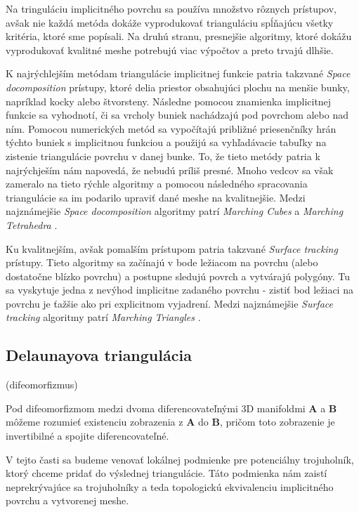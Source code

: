 Na tringuláciu implicitného povrchu sa používa množstvo rôznych prístupov, avšak nie každá metóda
dokáže vyprodukovať trianguláciu spĺňajúcu všetky kritéria, ktoré sme popísali. Na druhú stranu, 
presnejšie algoritmy, ktoré dokážu vyprodukovať kvalitné meshe potrebujú viac výpočtov a preto
trvajú dlhšie. 

K najrýchlejším metódam triangulácie implicitnej funkcie patria takzvané \textit{Space docomposition}
prístupy, ktoré delia priestor obsahujúci plochu na menšie bunky, napríklad kocky alebo štvorsteny.
Následne pomocou znamienka implicitnej funkcie sa vyhodnotí, či sa vrcholy buniek nachádzajú pod povrchom 
alebo nad ním. Pomocou numerických metód sa vypočítajú približné priesenčníky hrán týchto buniek s 
implicitnou funkciou a použijú sa vyhľadávacie tabuľky na zistenie triangulácie povrchu v danej bunke. 
To, že tieto metódy patria k najrýchješím nám napovedá, že nebudú príliš presné. Mnoho vedcov sa
však zameralo na tieto rýchle algoritmy a pomocou následného spracovania triangulácie sa im 
podarilo upraviť dané meshe na kvalitnejšie. Medzi najznámejšie \textit{Space docomposition} algoritmy
patrí \textit{Marching Cubes} \cite{lorensen1987marching} a \textit{Marching Tetrahedra} \cite{doi1991efficient}.

Ku kvalitnejším, avšak pomalším prístupom patria takzvané \textit{Surface tracking} prístupy.
Tieto algoritmy sa začínajú v bode ležiacom na povrchu (alebo dostatočne blízko povrchu) a 
postupne sledujú povrch a vytvárajú polygóny. Tu sa vyskytuje jedna z nevýhod implicitne zadaného
povrchu - zistiť bod ležiaci na povrchu je ťažšie ako pri explicitnom vyjadrení. Medzi najznámejšie 
\textit{Surface tracking} algoritmy patrí \textit{Marching Triangles} \cite{hilton1996marching}.



\subsection{Delaunayova triangulácia}

\begin{note}
    (difeomorfizmus)

    Pod difeomorfizmom medzi dvoma diferencovateľnými 3D manifoldmi $\mathbf{A}$ a $\mathbf{B}$ 
    môžeme rozumieť existenciu zobrazenia z $\mathbf{A}$ do $\mathbf{B}$, pričom toto zobrazenie 
    je invertibilné a spojite diferencovateľné. 
\end{note}

V tejto časti sa budeme venovať lokálnej podmienke pre potenciálny trojuholník, ktorý chceme pridať do 
výslednej triangulácie. Táto podmienka nám zaistí neprekrývajúce sa trojuholníky a teda topologickú 
ekvivalenciu implicitného povrchu a vytvorenej meshe.

